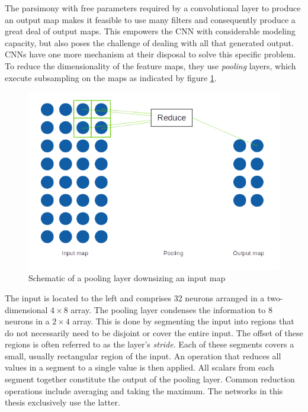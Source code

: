 \documentclass[11pt, a4paper]{article}
\begin{document}
The parsimony with free parameters required by a convolutional layer to produce an output map makes it feasible to use many filters and consequently produce a great deal of output maps. This empowers the CNN with considerable modeling capacity, but also poses the challenge of dealing with all that generated output. CNNs have one more mechanism at their disposal to solve this specific problem. To reduce the dimensionality of the feature maps, they use \emph{pooling} layers, which execute subsampling on the maps as indicated by figure \ref{fig:pooling-layer}.

\begin{figure}[h!tb]
	\centering
	\includegraphics{images/pooling_layer.png}
	\caption[Pooling layer functionality]{Schematic of a pooling layer downsizing an input map}
	\label{fig:pooling-layer}
\end{figure}

The input is located to the left and comprises 32 neurons arranged in a two-dimensional $4 \times 8$ array. The pooling layer condenses the information to 8 neurons in a $2 \times 4$ array. This is done by segmenting the input into regions that do not necessarily need to be disjoint or cover the entire input. The offset of these regions is often referred to as the layer's \emph{stride}. Each of these segments covers a small, usually rectangular region of the input. An operation that reduces all values in a segment to a single value is then applied. All scalars from each segment together constitute the output of the pooling layer. Common reduction operations include averaging and taking the maximum. The networks in this thesis exclusively use the latter.
\end{document}
